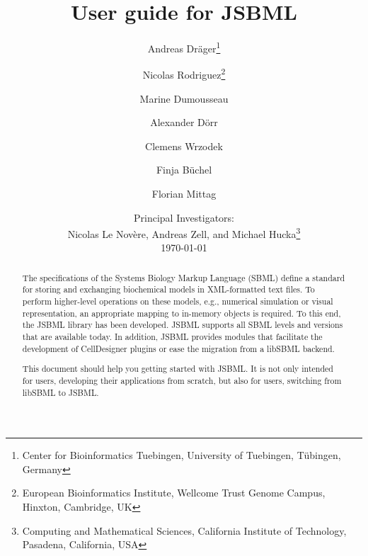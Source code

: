 \documentclass[
  BCOR12mm,
  letterpaper,
  11pt,
  headsepline,
  numbers=noenddot,
  caption=oneline,
  headinclude,
  appendixprefix,
  index=totoc,
  bibliography=totoc,
  twoside,
  titlepage
]{scrreprt}
\title{User guide for JSBML}
\author{Andreas Dr\"ager\thanks{Center for Bioinformatics Tuebingen, University
of Tuebingen, T\"ubingen, Germany}\and%
Nicolas Rodriguez\thanks{European Bioinformatics Institute, Wellcome Trust
Genome Campus, Hinxton, Cambridge, UK}\and%
Marine Dumousseau\footnotemark[2]\and%
Alexander D\"orr\footnotemark[1]\and%
Clemens Wrzodek\footnotemark[1]\and%
Finja B\"uchel\footnotemark[1]\and%
Florian Mittag\footnotemark[1]}
\date{Principal Investigators:\\
Nicolas Le Nov{\`e}re\footnotemark[2],
Andreas Zell\footnotemark[1], and
Michael Hucka\thanks{Computing and Mathematical Sciences, California Institute
of Technology, Pasadena, California, USA}\\[4ex]
\today}
\begin{document}
\maketitle

\begin{abstract}
The specifications of the Systems Biology Markup Language (SBML) define a
standard for storing and exchanging biochemical models in XML-formatted text
files. To perform higher-level operations on these models, e.g., numerical
simulation or visual representation, an appropriate mapping to in-memory objects
is required. To this end, the JSBML library has been developed. JSBML supports
all SBML levels and versions that are available today. In addition, JSBML
provides modules that facilitate the development of CellDesigner plugins or ease
the migration from a libSBML backend.

This document should help you getting started with JSBML. It is not only
intended for users, developing their applications from scratch, but also for users,
switching from libSBML to JSBML.



%
%
%
%
%
%


\end{abstract}
\end{document}
